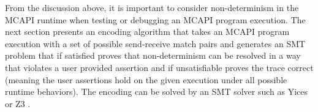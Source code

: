 From the discussion above, it is important to consider non-determinism
in the MCAPI runtime when testing or debugging an MCAPI program
execution.  The next section presents an encoding algorithm that takes
an MCAPI program execution with a set of possible send-receive match
pairs and generates an SMT problem that if satisfied proves that
non-determinism can be resolved in a way that violates a user provided
assertion and if unsatisfiable proves the trace correct (meaning the
user assertions hold on the given execution under all possible runtime
behaviors). The encoding can be solved by an SMT solver such as Yices
\cite{dutertre:CAV06} or Z3 \cite{demoura:tacas08}.



